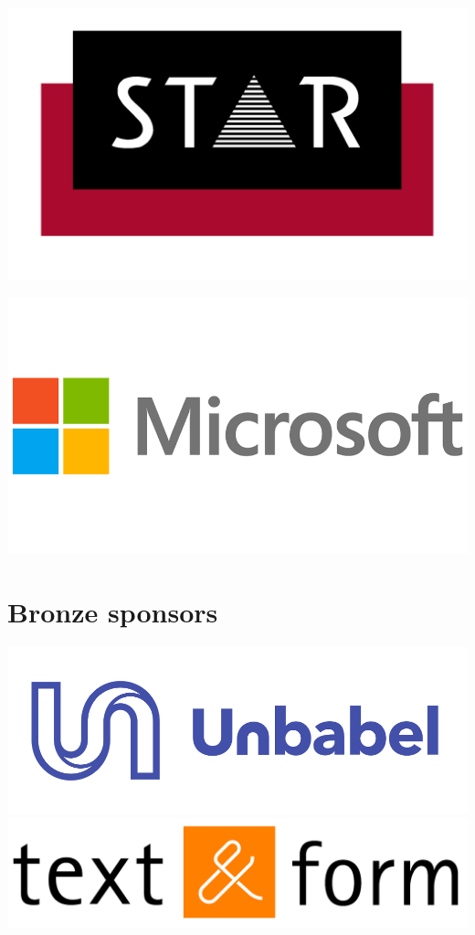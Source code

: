\documentclass[a4paper,11pt,twoside]{book}
\begin{document}
\vfill

\begin{center}
\includegraphics[width=0.8\columnwidth]{logos/star-logo.png}

\vfill

\includegraphics[width=0.9\columnwidth]{logos/microsoft-logo.png}
\end{center}

\vfill

\newpage

\section*{Bronze sponsors}

\includegraphics[width=0.50\columnwidth]{logos/unbabel-logo.png}\\

\hfill \includegraphics[width=0.50\columnwidth]{logos/textandform-logo.png}\\
\\
\end{document}
